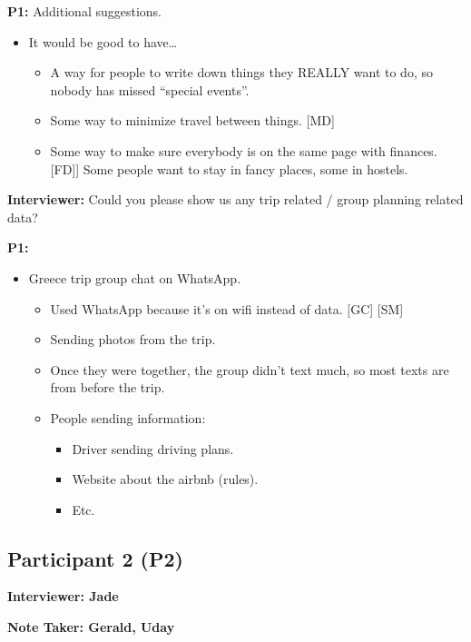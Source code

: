 \documentclass[12pt,a4paper]{article}
\begin{document}
\textbf{P1: }Additional suggestions. 

\begin{itemize}
    \item It would be good to have…
    \begin{itemize}
        \item A way for people to write down things they REALLY want to do, so nobody has missed “special events”. 
        \item Some way to minimize travel between things. [MD]
        \item Some way to make sure everybody is on the same page with finances. [FD]]
Some people want to stay in fancy places, some in hostels. 

    \end{itemize}
\end{itemize}

\textbf{Interviewer:} Could you please show us any trip related / group planning related data?

\textbf{P1:}

\begin{itemize}
    \item Greece trip group chat on WhatsApp.
    \begin{itemize}
        \item Used WhatsApp because it’s on wifi instead of data. [GC] [SM]
        \item Sending photos from the trip. 
        \item Once they were together, the group didn’t text much, so most texts are from before the trip. 
        \item People sending information: 
        \begin{itemize}
            \item Driver sending driving plans.
            \item Website about the airbnb (rules). 
            \item Etc. 
        \end{itemize}
    \end{itemize}
\end{itemize}


\subsection{Participant 2 (P2)}

\textbf{Interviewer: Jade}

\textbf{Note Taker: Gerald, Uday}
\end{document}
